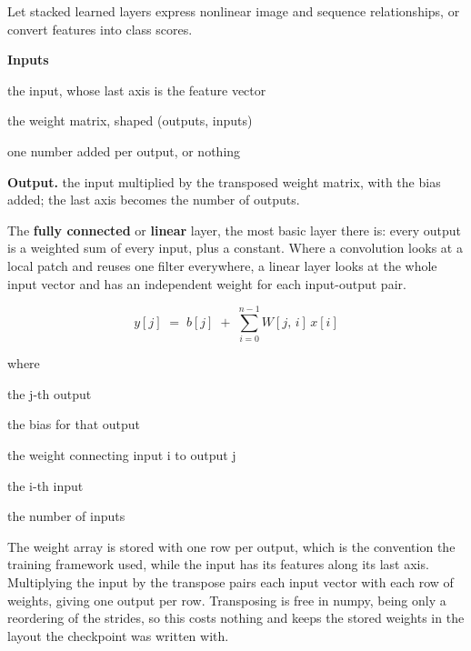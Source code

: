 Let stacked learned layers express nonlinear image and sequence relationships, or convert features into class scores.




\noindent\textbf{Inputs}
\begin{description}[leftmargin=2.2em,style=nextline,font=\normalfont\ttfamily]\setlength\itemsep{1pt}
  \item[{x}] \normalfont the input, whose last axis is the feature vector
  \item[{weight}] \normalfont the weight matrix, shaped (outputs, inputs)
  \item[{bias}] \normalfont one number added per output, or nothing
\end{description}

\noindent\textbf{Output.} the input multiplied by the transposed weight matrix, with the bias added; the last axis becomes the number of outputs.


The \textbf{fully connected} or \textbf{linear} layer, the most basic layer there is: every output is a weighted sum of every input, plus a constant. Where a convolution looks at a local patch and reuses one filter everywhere, a linear layer looks at the whole input vector and has an independent weight for each input-output pair.


\begin{equation}
y[j] \;=\; b[j] \;+\; \sum_{i=0}^{n-1} W[j,\,i] \, x[i]
\end{equation}

\noindent where
\begin{description}[leftmargin=2.4em,style=nextline,font=\normalfont\ttfamily]\setlength\itemsep{1pt}
  \item[{$y[j]$}] \normalfont the j-th output
  \item[{$b[j]$}] \normalfont the bias for that output
  \item[{$W[j,i]$}] \normalfont the weight connecting input i to output j
  \item[{$x[i]$}] \normalfont the i-th input
  \item[{$n$}] \normalfont the number of inputs
\end{description}

The weight array is stored with one row per output, which is the convention the training framework used, while the input has its features along its last axis. Multiplying the input by the transpose pairs each input vector with each row of weights, giving one output per row. Transposing is free in numpy, being only a reordering of the strides, so this costs nothing and keeps the stored weights in the layout the checkpoint was written with.


